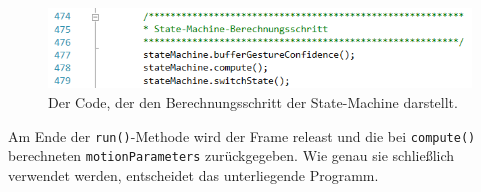 \begin{figure}[h]
\centering
\includegraphics[width=.8\textwidth]{pictures/statemachine-ber.png}
\caption{Der Code, der den Berechnungsschritt der State-Machine darstellt.}\label{fig:ber}
\end{figure}
Am Ende der \texttt{run()}-Methode wird der Frame \glqq{}releast\grqq{} und die bei \texttt{compute()} berechneten \texttt{motionParameters} zurückgegeben. Wie genau sie schließlich verwendet werden, entscheidet das unterliegende Programm.
